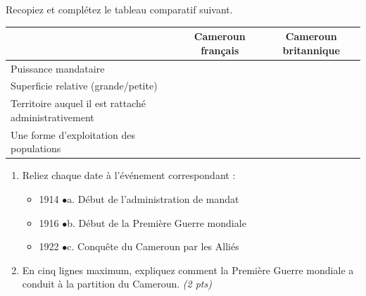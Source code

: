 \documentclass[11pt]{article}
\begin{document}
\begin{exercice}
Recopiez et complétez le tableau comparatif suivant.

\begin{center}
\begin{tabular}{|l|c|c|}
\hline
 & \textbf{Cameroun français} & \textbf{Cameroun britannique} \\
\hline
Puissance mandataire & & \\
\hline
Superficie relative (grande/petite) & & \\
\hline
Territoire auquel il est rattaché administrativement & & \\
\hline
Une forme d'exploitation des populations & & \\
\hline
\end{tabular}
\end{center}
\end{exercice}

\begin{exercice}
\begin{enumerate}
\item Reliez chaque date à l'événement correspondant :
\begin{itemize}
\item 1914 \quad$\bullet$\quad a. Début de l'administration de mandat
\item 1916 \quad$\bullet$\quad b. Début de la Première Guerre mondiale
\item 1922 \quad$\bullet$\quad c. Conquête du Cameroun par les Alliés
\end{itemize}
\item En cinq lignes maximum, expliquez comment la Première Guerre mondiale a conduit à la partition du Cameroun. \emph{(2 pts)}
\end{enumerate}
\end{exercice}
\end{document}
